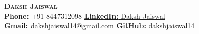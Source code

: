 \documentclass[letterpaper,11pt]{article}
\begin{document}
\noindent
\textbf{\huge \scshape Daksh Jaiswal} \\ \vspace{3pt}
\small \textbf{Phone: }+91 8447312098 \hspace{10.2cm}
\href{https://www.linkedin.com/in/dakshjaiswal14?utm_source=share&utm_campaign=share_via&utm_content=profile&utm_medium=ios_app}{\textbf{LinkedIn: }{Daksh Jaiswal}} \\
\textbf{Gmail: }\href{mailto:dakshjaiswal14@gmail.com}{dakshjaiswal14@gmail.com} \hspace{8.6cm}
\href{https://github.com/dakshjaiswal14}{\textbf{GitHub: }{dakshjaiswal14}}

\vspace{-10pt}

\end{document}
